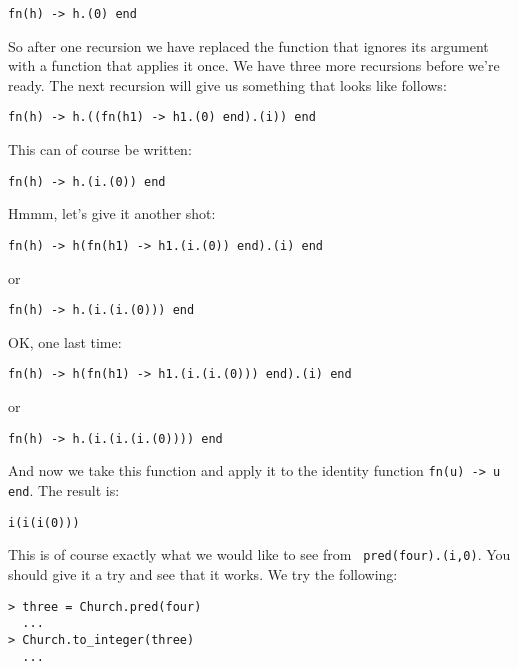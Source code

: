 \documentclass[a4paper,11pt]{article}
\begin{document}
\begin{verbatim}
fn(h) -> h.(0) end
\end{verbatim}

So after one recursion we have replaced the function that ignores its
argument with a function that applies it once.  We have three more
recursions before we're ready. The next recursion will give us
something that looks like follows:

\begin{verbatim}
fn(h) -> h.((fn(h1) -> h1.(0) end).(i)) end
\end{verbatim}

This can of course be written:

\begin{verbatim}
fn(h) -> h.(i.(0)) end
\end{verbatim}

Hmmm, let's give it another shot:

\begin{verbatim}
fn(h) -> h(fn(h1) -> h1.(i.(0)) end).(i) end
\end{verbatim}

or

\begin{verbatim}
fn(h) -> h.(i.(i.(0))) end
\end{verbatim}

OK, one last time:

\begin{verbatim}
fn(h) -> h(fn(h1) -> h1.(i.(i.(0))) end).(i) end
\end{verbatim}

or

\begin{verbatim}
fn(h) -> h.(i.(i.(i.(0)))) end 
\end{verbatim}

And now we take this function and apply it to the identity function
{\tt fn(u) -> u end}. The result is:

\begin{verbatim}
i(i(i(0)))
\end{verbatim}

This is of course exactly what we would like to see from {\tt
  pred(four).(i,0)}. You should give it a try
and see that it works. We try the following:

\begin{verbatim}
> three = Church.pred(four)
  ...
> Church.to_integer(three)
  ...
\end{verbatim}
\end{document}
